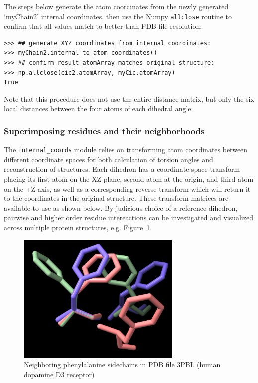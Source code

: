 The steps below generate the atom coordinates from the newly generated `myChain2' internal
coordinates, then use the Numpy \texttt{allclose\(\)} routine to confirm that all values match to
better than PDB file resolution:

\begin{verbatim}
>>> ## generate XYZ coordinates from internal coordinates:
>>> myChain2.internal_to_atom_coordinates()
>>> ## confirm result atomArray matches original structure:
>>> np.allclose(cic2.atomArray, myCic.atomArray)
True
\end{verbatim}

Note that this procedure does not use the entire distance matrix, but only the six local distances
between the four atoms of each dihedral angle.

\subsubsection{Superimposing residues and their neighborhoods}

The \texttt{internal\_coords} module relies on transforming atom coordinates between
different coordinate spaces for both calculation of torsion angles and reconstruction of
structures.  Each dihedron has a coordinate space transform placing its first atom on the
XZ plane, second atom at the origin, and third atom on the +Z axis, as well as a corresponding
reverse transform which will return it to the coordinates in the original structure.  These
transform matrices are available to use as shown below.  By judicious choice of a reference
dihedron, pairwise and higher order residue intereactions can be investigated and visualized
across multiple protein structures, e.g. Figure~\ref{fig:phepairs}.

\begin{figure}[htbp]
\centering
\begin{htmlonly}
\end{htmlonly}
\begin{latexonly}
\includegraphics[width=0.7\textwidth]{images/phe-pairs-3pbl.png}
\end{latexonly}
\caption{Neighboring phenylalanine sidechains in PDB file 3PBL (human dopamine D3 receptor)}
\label{fig:phepairs}
\end{figure}
	
